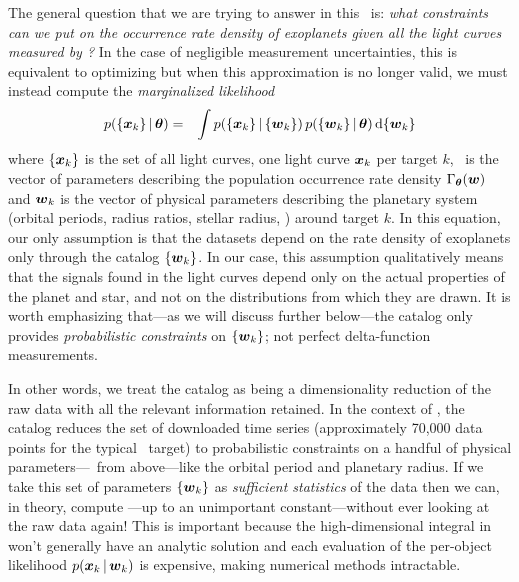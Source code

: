 The general question that we are trying to answer in this \paper\ is:
\emph{what constraints can we put on the occurrence rate density of exoplanets
given all the light curves measured by \kepler?}
In the case of negligible measurement uncertainties, this is equivalent to
optimizing  but when this approximation is no longer valid,
we must instead compute the \emph{marginalized likelihood}
\begin{eqnarray}\eqlabel{crazylike}
p(\{\data_k\}\,|\,\ratepars) &=&
    \int p(\{\data_k\}\,|\,\{\entry_k\})
    \,p(\{\entry_k\}\,|\,\ratepars)
    \dd\{\entry_k\}
\end{eqnarray}
where $\{{{\boldsymbol{x}}}_k\}$ is the set of all light curves, one light curve ${{\boldsymbol{x}}}_k$
per target $k$, \ratepars\ is the vector of parameters describing the
population occurrence rate density $\Gamma_{{\boldsymbol{{\theta}}}}({{\boldsymbol{w}}})$ and ${{\boldsymbol{w}}}_k$ is
the vector of physical parameters describing the planetary system (orbital
periods, radius ratios, stellar radius, \etc) around target $k$.
In this equation, our only assumption is that the datasets depend on the
rate density of exoplanets only through the catalog $\{{{\boldsymbol{w}}}_k\}$.
In our case, this assumption qualitatively means that the signals found in the
light curves depend only on the actual properties of the planet and star, and
not on the distributions from which they are drawn.
It is worth emphasizing that---as we will discuss further below---the catalog
only provides \emph{probabilistic constraints} on $\{{{\boldsymbol{w}}}_k\}$; not perfect
delta-function measurements.

In other words, we treat the catalog as being a dimensionality reduction of
the raw data with all the relevant information retained.
In the context of \kepler, the catalog reduces the set of downloaded time
series (approximately 70,000 data points for the typical \kepler\ target) to
probabilistic constraints on a handful of physical parameters---\entry\ from
above---like the orbital period and planetary radius.
If we take this set of parameters $\{{{\boldsymbol{w}}}_k\}$ as \emph{sufficient
statistics} of the data then we can, in theory, compute ---up to
an unimportant constant---without ever looking at the raw data again!
This is important because the high-dimensional integral in 
won't generally have an analytic solution and each evaluation of the
per-object likelihood $p({{\boldsymbol{x}}}_k\,|\,{{\boldsymbol{w}}}_k)$ is expensive, making numerical
methods intractable.

